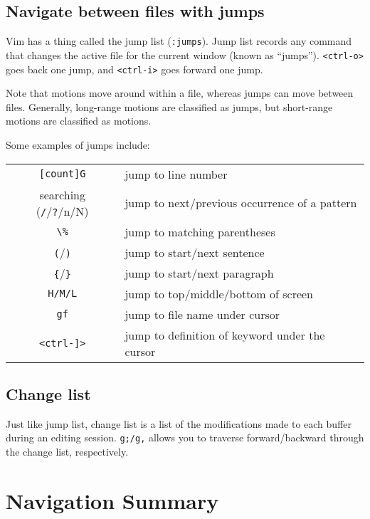 \subsection{Navigate between files with jumps}

Vim has a thing called the jump list (\verb|:jumps|).
Jump list records any command that changes the active file for the current window (known as ``jumps'').
\verb|<ctrl-o>| goes back one jump, and \verb|<ctrl-i>| goes forward one jump.

Note that motions move around within a file, whereas jumps can move between files.
Generally, long-range motions are classified as jumps, but short-range motions are classified as motions.

Some examples of jumps include:
\newline

\begin{tabular}{c|l}
    \verb|[count]G| & jump to line number\\
    searching (\verb|/|/\verb|?|/n/N) & jump to next/previous occurrence of a pattern\\
    \verb|\%| & jump to matching parentheses\\
    \verb|(|/\verb|)| & jump to start/next sentence\\
    \verb|{|/\verb|}| & jump to start/next paragraph\\
    \verb|H/M/L| & jump to top/middle/bottom of screen\\
    \verb|gf| & jump to file name under cursor\\
    \verb|<ctrl-]>| & jump to definition of keyword under the cursor \\
\end{tabular}

\subsection{Change list}

Just like jump list, change list is a list of the modifications made to each buffer during an editing session.
\verb|g;/g,| allows you to traverse forward/backward through the change list, respectively.

\section{Navigation Summary}

\begin{center}
\end{center}
